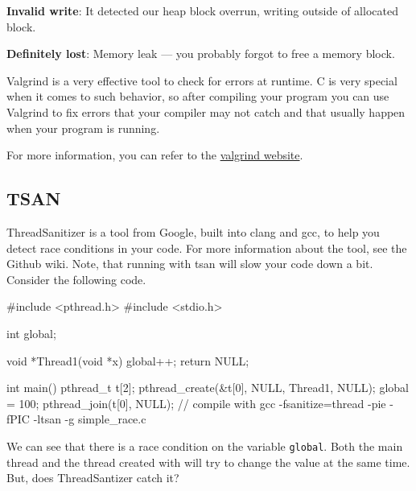 \textbf{Invalid write}: It detected our heap block overrun, writing outside of allocated block.

\textbf{Definitely lost}: Memory leak --- you probably forgot to free a memory block.

Valgrind is a very effective tool to check for errors at runtime. C is very special when it comes to such behavior, so after compiling your program you can use Valgrind to fix errors that your compiler may not catch and that usually happen when your program is running.

For more information, you can refer to the \href{http://valgrind.org/docs/manual/quick-start.html}{valgrind website}.

\subsection{TSAN}

ThreadSanitizer is a tool from Google, built into clang and gcc, to help you detect race conditions in your code. For more information about the tool, see the Github wiki. Note, that running with tsan will slow your code down a bit. Consider the following code.

\begin{code}[language=C]
#include <pthread.h>
#include <stdio.h>

int global;

void *Thread1(void *x) {
    global++;
    return NULL;
}

int main() {
    pthread_t t[2];
    pthread_create(&t[0], NULL, Thread1, NULL);
    global = 100;
    pthread_join(t[0], NULL);
}
// compile with gcc -fsanitize=thread -pie -fPIC -ltsan -g simple_race.c
\end{code}

We can see that there is a race condition on the variable \texttt{global}. Both the main thread and the thread created with  will try to change the value at the same time. But, does ThreadSantizer catch it?


